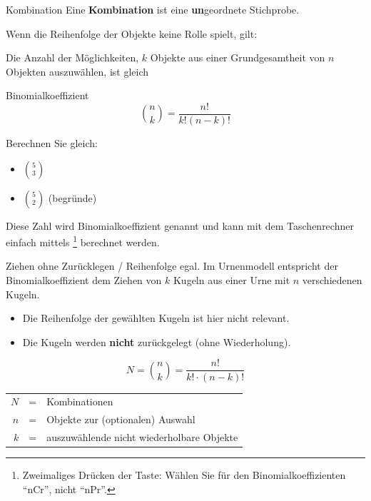 \newpage

\begin{definition}{Kombination}{}
Eine \textbf{Kombination} ist eine \textbf{un}geordnete Stichprobe.
\end{definition}

Wenn die Reihenfolge der Objekte keine Rolle spielt, gilt:

Die Anzahl der Möglichkeiten, $k$ Objekte aus einer Grundgesamtheit
von $n$ Objekten auszuwählen, ist gleich

\begin{definition}{Binomialkoeffizient}{}
$${n\choose k} = \frac{n!}{k!(n-k)!}$$
\end{definition}

Berechnen Sie gleich:
\begin{itemize}
\item $5\choose 3$
\item $5\choose 2$ (begründe) 
\end{itemize}


Diese Zahl wird Binomialkoeffizient genannt und kann mit dem
Taschenrechner einfach
mittels \footnote{Zweimaliges Drücken der Taste:
Wählen Sie für den Binomialkoeffizienten ``nCr'', nicht ``nPr''.}
berechnet werden.



\begin{gesetz}{Ziehen ohne Zurücklegen / Reihenfolge egal.}{}
Im Urnenmodell entspricht der Binomialkoeffizient dem Ziehen von $k$ Kugeln aus einer
Urne mit $n$ verschiedenen Kugeln.
\begin{itemize}
\item
  Die Reihenfolge der gewählten
  Kugeln ist hier nicht relevant.
\item Die Kugeln werden \textbf{nicht} zurückgelegt (ohne
  Wiederholung).
\end{itemize}

$$N = {n \choose k} = \frac{n!}{k!\cdot{}(n-k)!}$$
\begin{tabular}{rcl}
  $N$ &=& Kombinationen\\
  $n$ &=& Objekte zur (optionalen) Auswahl\\
  $k$ &=& auszuwählende nicht wiederholbare Objekte\\
\end{tabular}


\end{gesetz}
\newpage

